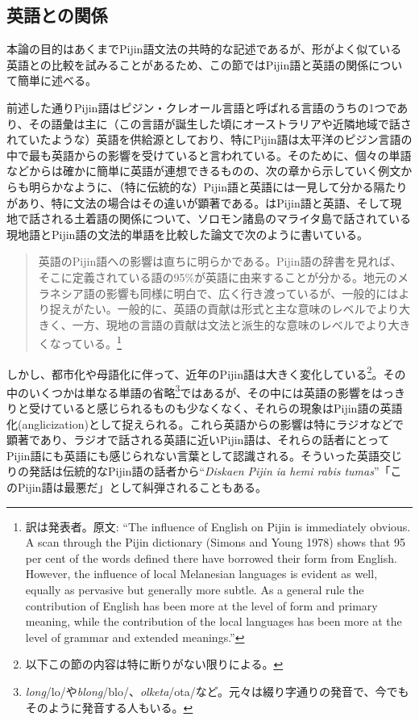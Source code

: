 \subsection{英語との関係}
本論の目的はあくまでPijin語文法の共時的な記述であるが、形がよく似ている英語との比較を試みることがあるため、この節ではPijin語と英語の関係について簡単に述べる。

前述した通りPijin語はピジン・クレオール言語と呼ばれる言語のうちの1つであり、その語彙は主に（この言語が誕生した頃にオーストラリアや近隣地域で話されていたような）英語を供給源としており、特にPijin語は太平洋のピジン言語の中で最も英語からの影響を受けていると言われている\citep{nativization}。そのために、個々の単語などからは確かに簡単に英語が連想できるものの、次の章から示していく例文からも明らかなように、（特に伝統的な）Pijin語と英語には一見して分かる隔たりがあり、特に文法の場合はその違いが顕著である。\cite{malaitan}はPijin語と英語、そして現地で話される土着語の関係について、ソロモン諸島のマライタ島で話されている現地語とPijin語の文法的単語を比較した論文で次のように書いている。

\begin{quotation}
  英語のPijin語への影響は直ちに明らかである。Pijin語の辞書\citep{yumi}を見れば、そこに定義されている語の95\%が英語に由来することが分かる。地元のメラネシア語の影響も同様に明白で、広く行き渡っているが、一般的にはより捉えがたい。一般的に、英語の貢献は形式と主な意味のレベルでより大きく、一方、現地の言語の貢献は文法と派生的な意味のレベルでより大きくなっている。\citep{malaitan}\footnote{訳は発表者。原文: ``The influence of English on Pijin is immediately obvious. A scan through the Pijin dictionary (Simons and Young 1978) shows that 95 per cent of the words defined there have borrowed their form from English. However, the influence of local Melanesian languages is evident as well, equally as pervasive but generally more subtle. As a general rule the contribution of English has been more at the level of form and primary meaning, while the contribution of the local languages has been more at the level of grammar and extended meanings.''}
\end{quotation}

しかし、都市化や母語化に伴って、近年のPijin語は大きく変化している\footnote{
以下この節の内容は特に断りがない限り\cite{nativization}による。}。その中のいくつかは単なる単語の省略\footnote{
\textit{long}/lo/や\textit{blong}/blo/、\textit{olketa}/ota/など。元々は綴り字通りの発音で、今でもそのように発音する人もいる。}ではあるが、その中には英語の影響をはっきりと受けていると感じられるものも少なくなく、それらの現象はPijin語の英語化(anglicization)として捉えられる。これら英語からの影響は特にラジオなどで顕著であり、ラジオで話される英語に近いPijin語は、それらの話者にとってPijin語にも英語にも感じられない言葉として認識される。そういった英語交じりの発話は伝統的なPijin語の話者から``\textit{Diskaen Pijin ia hemi rabis tumas}''「このPijin語は最悪だ」として糾弾されることもある。

